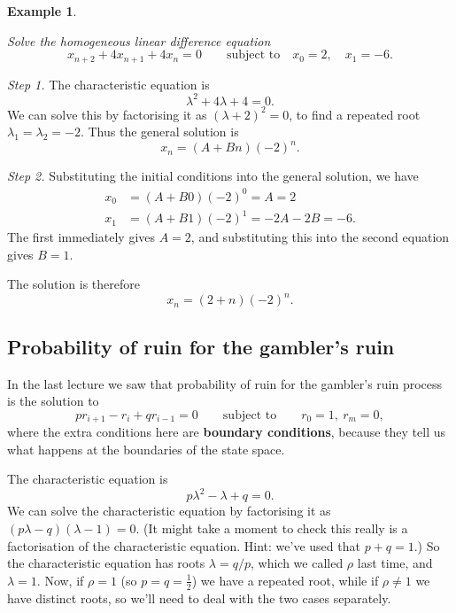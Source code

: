 \documentclass[
  a4paper,
]{article}
\theoremstyle{definition}
\theoremstyle{definition}
\newtheorem{example}{Example}[section]
\theoremstyle{definition}
\theoremstyle{remark}
\begin{document}
\begin{example}
\protect\hypertarget{exm:lde2}{}\label{exm:lde2}

\emph{Solve the homogeneous linear difference equation}
\[ x_{n+2} + 4x_{n+1} +4x_n = 0 \qquad \text{subject to} \quad x_0 = 2,\quad x_1 = -6 . \]

\emph{Step 1.} The characteristic equation is
\[ \lambda^2 + 4\lambda + 4 = 0 . \]
We can solve this by factorising it as \((\lambda + 2)^2 = 0\), to find a repeated root \(\lambda_1 = \lambda_2 = -2\). Thus the general solution is
\[ x_n = (A + Bn) (-2)^n . \]

\emph{Step 2.} Substituting the initial conditions into the general solution, we have
\begin{align*}
x_0 &= (A + B0)(-2)^0 = A = 2 \\
x_1 &= (A + B1)(-2)^1 = -2A - 2B = -6 .
\end{align*}
The first immediately gives \(A = 2\), and substituting this into the second equation gives \(B = 1\).

The solution is therefore
\[ x_n = (2 + n)(-2)^n . \]

\end{example}

\hypertarget{ruin-probability-solve}{%
\subsection{Probability of ruin for the gambler's ruin}\label{ruin-probability-solve}}

In the last lecture we saw that probability of ruin for the gambler's ruin process is the solution to
\[ pr_{i+1} - r_i + qr_{i-1} = 0 \qquad \text{subject to} \qquad r_0 = 1,\ r_m = 0 , \]
where the extra conditions here are \textbf{boundary conditions}, because they tell us what happens at the boundaries of the state space.

The characteristic equation is
\[ p\lambda^2 - \lambda + q = 0 .\]
We can solve the characteristic equation by factorising it as \((p \lambda - q)(\lambda - 1) = 0\). (It might take a moment to check this really is a factorisation of the characteristic equation. Hint: we've used that \(p+q=1\).) So the characteristic equation has roots \(\lambda = q/p\), which we called \(\rho\) last time, and \(\lambda = 1\). Now, if \(\rho = 1\) (so \(p = q = \frac12\)) we have a repeated root, while if \(\rho \neq 1\) we have distinct roots, so we'll need to deal with the two cases separately.
\end{document}
